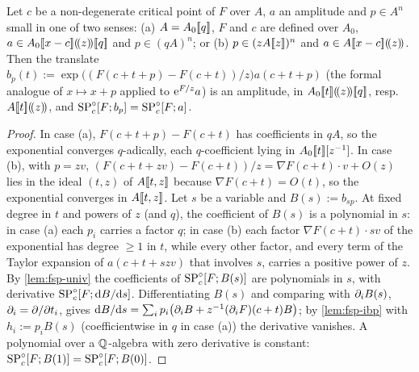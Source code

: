 
\begin{lem}[Translations]
\label{lem:fsp-transl}
Let $c$ be a non-degenerate critical point of $F$ over $A$, $a$ an amplitude and $p\in A^n$ small in one of two senses: (a) $A=A_0[\![ q ]\!]$, $F$ and $c$ are defined over $A_0$, $a\in A_0[\![ x-c ]\!](\!(z)\!)[\![ q ]\!]$ and $p\in(qA)^n$; or (b) $p\in(zA[\![ z ]\!])^n$ and $a\in A[\![ x-c ]\!](\!(z)\!)$. Then the translate $b_p(t):=\exp\bigl((F(c+t+p)-F(c+t))/z\bigr)a(c+t+p)$ (the formal analogue of $x\mapsto x+p$ applied to $\mathrm{e}^{F/z}a$) is an amplitude, in $A_0[\![ t ]\!](\!(z)\!)[\![ q ]\!]$, resp.\ $A[\![ t ]\!](\!(z)\!)$, and $\mathrm{SP}^{\circ}_c[F;b_p]=\mathrm{SP}^{\circ}_c[F;a]$.
\end{lem}

\begin{proof}
In case (a), $F(c+t+p)-F(c+t)$ has coefficients in $qA$, so the exponential converges $q$-adically, each $q$-coefficient lying in $A_0[\![ t ]\!][z^{-1}]$. In case (b), with $p=zv$, $(F(c+t+zv)-F(c+t))/z=\nabla F(c+t)\cdot v+O(z)$ lies in the ideal $(t,z)$ of $A[\![ t,z ]\!]$ because $\nabla F(c+t)=O(t)$, so the exponential converges in $A[\![ t,z ]\!]$. Let $s$ be a variable and $B(s):=b_{sp}$. At fixed degree in $t$ and powers of $z$ (and $q$), the coefficient of $B(s)$ is a polynomial in $s$: in case (a) each $p_i$ carries a factor $q$; in case (b) each factor $\nabla F(c+t)\cdot sv$ of the exponential has degree $\geq1$ in $t$, while every other factor, and every term of the Taylor expansion of $a(c+t+szv)$ that involves $s$, carries a positive power of $z$. By \cref{lem:fsp-univ} the coefficients of $\mathrm{SP}^{\circ}_c[F;B(s)]$ are polynomials in $s$, with derivative $\mathrm{SP}^{\circ}_c[F;\mathrm{d} B/\mathrm{d} s]$. Differentiating $B(s)$ and comparing with $\partial_iB(s)$, $\partial_i=\partial/\partial t_i$, gives $\mathrm{d} B/\mathrm{d} s=\sum_ip_i\bigl(\partial_iB+z^{-1}(\partial_iF)(c+t)B\bigr)$; by \cref{lem:fsp-ibp} with $h_i:=p_iB(s)$ (coefficientwise in $q$ in case (a)) the derivative vanishes. A polynomial over a $\mathbb{Q}$-algebra with zero derivative is constant: $\mathrm{SP}^{\circ}_c[F;B(1)]=\mathrm{SP}^{\circ}_c[F;B(0)]$.
\end{proof}

